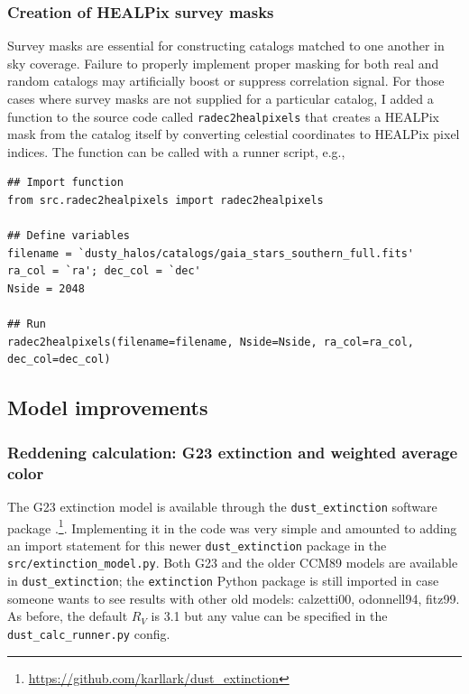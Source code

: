 \documentclass[11pt, oneside]{article}   	%
\begin{document}
\subsubsection{Creation of HEALPix survey masks}\label{sec:code:healpix}

Survey masks are essential for constructing catalogs matched to one another in sky coverage. Failure to properly implement proper masking for both real and random catalogs may artificially boost or suppress correlation signal. 
For those cases where survey masks are not supplied for a particular catalog, I added a function to the source code called \texttt{radec2healpixels} that creates a HEALPix mask from the catalog itself by converting celestial coordinates to HEALPix pixel indices. The function can be called with a runner script, e.g.,  

\small
\begin{verbatim}
## Import function
from src.radec2healpixels import radec2healpixels

## Define variables
filename = `dusty_halos/catalogs/gaia_stars_southern_full.fits'
ra_col = `ra'; dec_col = `dec'
Nside = 2048

## Run
radec2healpixels(filename=filename, Nside=Nside, ra_col=ra_col, dec_col=dec_col)

\end{verbatim}
\normalsize


\subsection{Model improvements}\label{sec:modelupdates}

\subsubsection{Reddening calculation: G23 extinction and weighted average color}
The G23 extinction model is available through the \texttt{dust\_extinction} software package \cite{Gordon2024}.\footnote{\url{https://github.com/karllark/dust_extinction}}. Implementing it in the code was very simple and amounted to adding an import statement for this newer \texttt{dust\_extinction} package in the \texttt{src/extinction\_model.py}. Both G23 and the older CCM89 models are available in \texttt{dust\_extinction}; the \texttt{extinction} Python package is still imported in case someone wants to see results with other old models: calzetti00, odonnell94, fitz99. As before, the default $R_V$ is 3.1 but any value can be specified in the \texttt{dust\_calc\_runner.py} config. 
\end{document}
